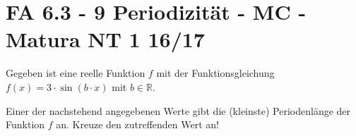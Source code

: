 \section{FA 6.3 - 9 Periodizität - MC - Matura NT 1 16/17}

\begin{beispiel}[FA 6.3]{1} %
Gegeben ist eine reelle Funktion $f$ mit der Funktionsgleichung $f(x)=3\cdot\sin(b\cdot x)$ mit $b\in\mathbb{R}$.

Einer der nachstehend angegebenen Werte gibt die (kleinste) Periodenlänge der Funktion $f$ an. Kreuze den zutreffenden Wert an!

\end{beispiel}